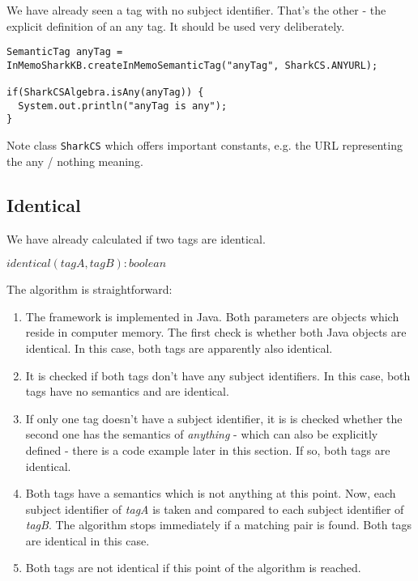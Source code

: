 We have already seen a tag with no subject identifier. That's the other - the explicit definition of an any tag. It should be used very deliberately.

\begin{verbatim}
SemanticTag anyTag =
InMemoSharkKB.createInMemoSemanticTag("anyTag", SharkCS.ANYURL);

if(SharkCSAlgebra.isAny(anyTag)) {
  System.out.println("anyTag is any");
}
\end{verbatim}

Note class {\tt SharkCS} which offers important constants, e.g. the URL
representing the any / nothing meaning.

\subsection{Identical}
We have already calculated if two tags are identical.

$identical(tagA, tagB): boolean$

The algorithm is straightforward:

\begin{enumerate}
    \item
The framework is implemented in Java. Both parameters are objects which reside in computer memory. The first check is whether both Java objects are identical. In this case, both tags are apparently also identical.

\item
It is checked if both tags don't have any subject identifiers. In this case, both tags have no semantics and are identical.

\item
If only one tag doesn't have a subject identifier, it is is checked whether the second one has the semantics of {\it anything} - which can also be explicitly defined - there is a code example later in this section. If so, both tags are identical.

\item
Both tags have a semantics which is not anything at this point. Now, each subject identifier of {\it tagA} is taken and compared to each subject identifier of {\it tagB}. The algorithm stops immediately if a matching pair is found. Both tags are identical in this case.

\item
Both tags are not identical if this point of the algorithm is reached.

\end{enumerate}

